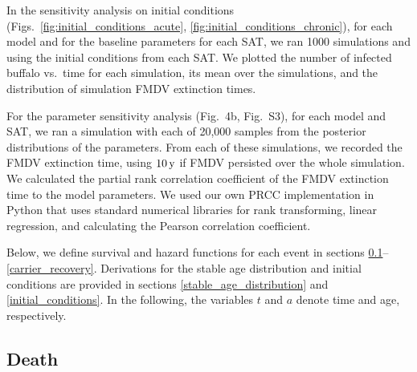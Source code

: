 \documentclass[12pt, USenglish]{article}  %
\begin{document}
In the sensitivity analysis on initial conditions
(Figs.~\ref{fig:initial_conditions_acute},
\ref{fig:initial_conditions_chronic}), for each model and for the
baseline parameters for each SAT, we ran 1000 simulations and using
the initial conditions from each SAT. We plotted the number of
infected buffalo vs.~time for each simulation, its mean over the
simulations, and the distribution of simulation FMDV extinction times.

For the parameter sensitivity analysis (Fig.~4b, Fig.~S3), for each
model and SAT, we ran a simulation with each of 20,000 samples from
the posterior distributions of the parameters. From each of these
simulations, we recorded the FMDV extinction time, using
$\unit[10]{y}$ if FMDV persisted over the whole simulation. We
calculated the partial rank correlation coefficient
\autocites(PRCC;)(){blower_1994}{marino_2008}
of the FMDV extinction time to the model parameters. We used our own
PRCC implementation in Python that uses standard numerical libraries
for rank transforming, linear regression, and calculating the Pearson
correlation coefficient.

Below, we define survival and hazard functions for each event in
sections \ref{death}–\ref{carrier_recovery}. Derivations for the
stable age distribution and initial conditions are provided in
sections \ref{stable_age_distribution} and
\ref{initial_conditions}. In the following, the variables $t$ and $a$
denote time and age, respectively.

\subsection{Death}
\label{death}
\end{document}
